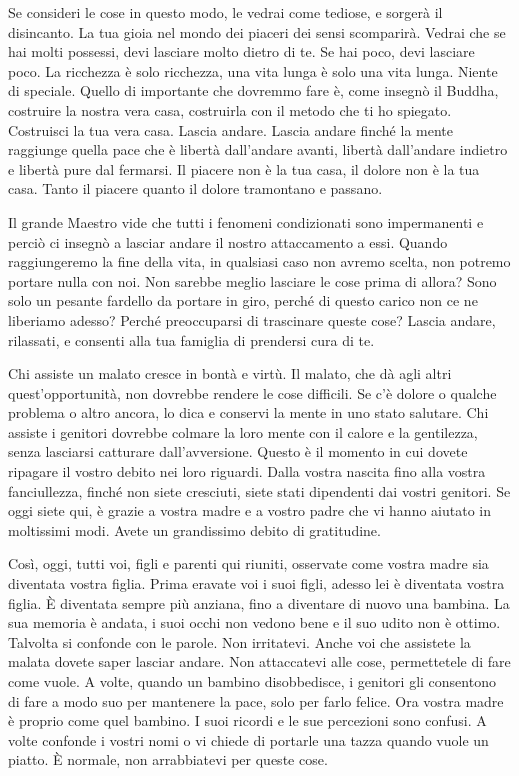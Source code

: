 Se consideri le cose in questo modo, le vedrai come tediose, e sorgerà
il disincanto. La tua gioia nel mondo dei piaceri dei sensi scomparirà.
Vedrai che se hai molti possessi, devi lasciare molto dietro di te. Se
hai poco, devi lasciare poco. La ricchezza è solo ricchezza, una vita
lunga è solo una vita lunga. Niente di speciale. Quello di importante
che dovremmo fare è, come insegnò il Buddha, costruire la nostra vera
casa, costruirla con il metodo che ti ho spiegato. Costruisci la tua
vera casa. Lascia andare. Lascia andare finché la mente raggiunge quella
pace che è libertà dall'andare avanti, libertà dall'andare indietro e
libertà pure dal fermarsi. Il piacere non è la tua casa, il dolore non è
la tua casa. Tanto il piacere quanto il dolore tramontano e passano.

Il grande Maestro vide che tutti i fenomeni condizionati sono
impermanenti e perciò ci insegnò a lasciar andare il nostro attaccamento
a essi. Quando raggiungeremo la fine della vita, in qualsiasi caso non
avremo scelta, non potremo portare nulla con noi. Non sarebbe meglio
lasciare le cose prima di allora? Sono solo un pesante fardello da
portare in giro, perché di questo carico non ce ne liberiamo adesso?
Perché preoccuparsi di trascinare queste cose? Lascia andare, rilassati,
e consenti alla tua famiglia di prendersi cura di te.

Chi assiste un malato cresce in bontà e virtù. Il malato, che dà agli
altri quest'opportunità, non dovrebbe rendere le cose difficili. Se c'è
dolore o qualche problema o altro ancora, lo dica e conservi la mente in
uno stato salutare. Chi assiste i genitori dovrebbe colmare la loro
mente con il calore e la gentilezza, senza lasciarsi catturare
dall'avversione. Questo è il momento in cui dovete ripagare il vostro
debito nei loro riguardi. Dalla vostra nascita fino alla vostra
fanciullezza, finché non siete cresciuti, siete stati dipendenti dai
vostri genitori. Se oggi siete qui, è grazie a vostra madre e a vostro
padre che vi hanno aiutato in moltissimi modi. Avete un grandissimo
debito di gratitudine.

Così, oggi, tutti voi, figli e parenti qui riuniti, osservate come
vostra madre sia diventata vostra figlia. Prima eravate voi i suoi
figli, adesso lei è diventata vostra figlia. È diventata sempre più
anziana, fino a diventare di nuovo una bambina. La sua memoria è andata,
i suoi occhi non vedono bene e il suo udito non è ottimo. Talvolta si
confonde con le parole. Non irritatevi. Anche voi che assistete la
malata dovete saper lasciar andare. Non attaccatevi alle cose,
permettetele di fare come vuole. A volte, quando un bambino
disobbedisce, i genitori gli consentono di fare a modo suo per mantenere
la pace, solo per farlo felice. Ora vostra madre è proprio come quel
bambino. I suoi ricordi e le sue percezioni sono confusi. A volte
confonde i vostri nomi o vi chiede di portarle una tazza quando vuole un
piatto. È normale, non arrabbiatevi per queste cose.

